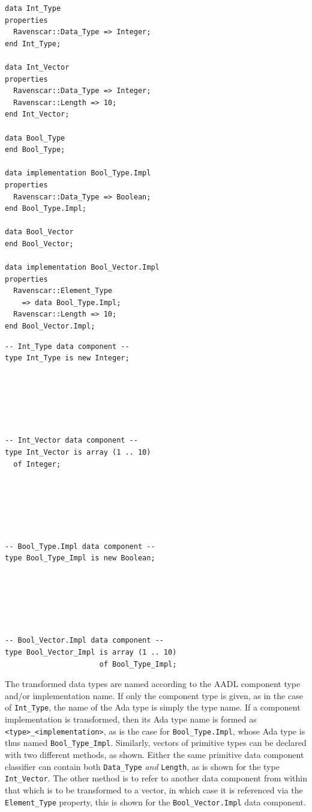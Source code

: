 \begin{minipage}{0.45\linewidth}
\lstset{language=aadl}
\begin{lstlisting}[label=lst:primitive_type_aadl, caption=Primitive
    types in AADL.]
data Int_Type
properties
  Ravenscar::Data_Type => Integer;
end Int_Type;

data Int_Vector
properties
  Ravenscar::Data_Type => Integer;
  Ravenscar::Length => 10;
end Int_Vector;

data Bool_Type
end Bool_Type;

data implementation Bool_Type.Impl
properties
  Ravenscar::Data_Type => Boolean;
end Bool_Type.Impl;

data Bool_Vector
end Bool_Vector;

data implementation Bool_Vector.Impl
properties
  Ravenscar::Element_Type 
    => data Bool_Type.Impl;
  Ravenscar::Length => 10;
end Bool_Vector.Impl;
\end{lstlisting}
\end{minipage}
\hspace{5mm}
\begin{minipage}{0.45\linewidth}
\lstset{language=ada}
\begin{lstlisting}[label=lst:primitive_type_ada, caption=The
    transformed types in Ada.]
-- Int_Type data component --
type Int_Type is new Integer;






-- Int_Vector data component --
type Int_Vector is array (1 .. 10)
  of Integer;






-- Bool_Type.Impl data component --
type Bool_Type_Impl is new Boolean;






-- Bool_Vector.Impl data component --
type Bool_Vector_Impl is array (1 .. 10) 
                      of Bool_Type_Impl;
\end{lstlisting}
\end{minipage}

The transformed data types are named according to the AADL component
type and/or implementation name. If only the component type is given,
as in the case of \texttt{Int\_Type}, the name of the Ada type is
simply the type name. If a component implementation is transformed,
then its Ada type name is formed as \texttt{<type>\_<implementation>},
as is the case for \texttt{Bool\_Type.Impl}, whose Ada type is thus
named \texttt{Bool\_Type\_Impl}. Similarly, vectors of primitive types
can be declared with two different methods, as shown. Either the same
primitive data component classifier can contain both
\texttt{Data\_Type} \emph{and} \texttt{Length}, as is shown for the
type \texttt{Int\_Vector}. The other method is to refer to another
data component from within that which is to be transformed to a
vector, in which case it is referenced via the \texttt{Element\_Type}
property, this is shown for the \texttt{Bool\_Vector.Impl} data
component.

